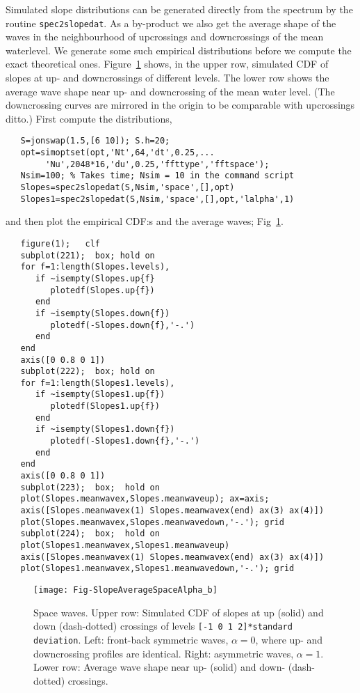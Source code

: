 Simulated slope distributions can be generated directly from the spectrum by the routine {\tt spec2slopedat}. As a by-product we also get the average shape of the waves in the neighbourhood of upcrossings and downcrossings of the mean waterlevel. We generate some such empirical distributions before we compute the exact theoretical ones. Figure~\ref{Fig1.7} shows, in the upper row, simulated CDF of slopes at up- and downcrossings of different levels.  The lower row shows the average wave shape near up- and downcrossing of the mean water level. (The downcrossing curves are mirrored in the origin to be comparable with upcrossings ditto.)  First compute the distributions,

{\small\begin{verbatim}
   S=jonswap(1.5,[6 10]); S.h=20;
   opt=simoptset(opt,'Nt',64,'dt',0.25,...
        'Nu',2048*16,'du',0.25,'ffttype','fftspace');
   Nsim=100; % Takes time; Nsim = 10 in the command script
   Slopes=spec2slopedat(S,Nsim,'space',[],opt)
   Slopes1=spec2slopedat(S,Nsim,'space',[],opt,'lalpha',1)
\end{verbatim}
}
\noindent
and then plot the empirical CDF:s and the average waves; Fig~\ref{Fig1.7}.
{\small\begin{verbatim}
   figure(1);   clf
   subplot(221);  box; hold on
   for f=1:length(Slopes.levels),
      if ~isempty(Slopes.up{f}
         plotedf(Slopes.up{f})
      end
      if ~isempty(Slopes.down{f})
         plotedf(-Slopes.down{f},'-.')
      end
   end
   axis([0 0.8 0 1])
   subplot(222);  box; hold on
   for f=1:length(Slopes1.levels),
      if ~isempty(Slopes1.up{f})
         plotedf(Slopes1.up{f})
      end
      if ~isempty(Slopes1.down{f})
         plotedf(-Slopes1.down{f},'-.')
      end
   end
   axis([0 0.8 0 1])
   subplot(223);  box;  hold on
   plot(Slopes.meanwavex,Slopes.meanwaveup); ax=axis;
   axis([Slopes.meanwavex(1) Slopes.meanwavex(end) ax(3) ax(4)])
   plot(Slopes.meanwavex,Slopes.meanwavedown,'-.'); grid
   subplot(224);  box;  hold on
   plot(Slopes1.meanwavex,Slopes1.meanwaveup)
   axis([Slopes.meanwavex(1) Slopes.meanwavex(end) ax(3) ax(4)])
   plot(Slopes1.meanwavex,Slopes1.meanwavedown,'-.'); grid
\end{verbatim}
}
\begin{figure}[h]
\centerline{
\texttt{[image: Fig-SlopeAverageSpaceAlpha\_b]}
}
\caption{Space waves. Upper row: Simulated CDF of slopes at up (solid) and down (dash-dotted)  crossings of levels {\tt [-1 0 1 2]*standard deviation}. Left: front-back symmetric waves, $\alpha = 0$, where up- and downcrossing profiles are identical. Right: asymmetric waves, $\alpha = 1$. Lower row: Average wave shape near up- (solid) and down- (dash-dotted) crossings.}
\label{Fig1.7}
\end{figure}

